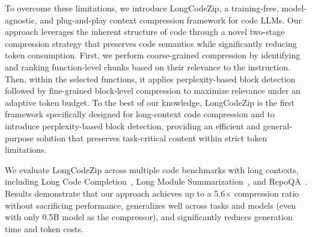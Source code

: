 \documentclass[10pt,conference]{IEEEtran}
\newcommand{\todoc}[2]{{\textcolor{#1}{\textbf{[#2]}}}}
\newcommand{\todoblue}[1]{\todoc{blue}{\textbf{#1}}}
\newcommand{\gu}[1]{\todoblue{Gu: #1}}
\newcommand{\shi}[1]{\todoc{orange}{Shi: #1}}
\newcommand{\approach}{{LongCodeZip}\xspace} %
\begin{document}
To overcome these limitations, we introduce \approach, a training-free, model-agnostic, and plug-and-play context compression framework for code LLMs. Our approach leverages the inherent structure of code through a novel two-stage compression strategy that preserves code semantics while significantly reducing token consumption. First, we perform coarse-grained compression by identifying and ranking function-level chunks based on their relevance to the instruction. Then, within the selected functions, it applies perplexity-based block detection followed by fine-grained block-level compression %
to maximize relevance under an adaptive token budget. To the best of our knowledge, \approach is the first framework specifically designed for long-context code compression and to introduce perplexity-based block detection, providing an efficient and general-purpose solution that preserves task-critical content within strict token limitations. 

We evaluate \approach across multiple code benchmarks with long contexts, including Long Code Completion~\cite{guo2023longcoder}, Long Module Summarization~\cite{bogomolov2024long}, and RepoQA~\cite{liu2024repoqa}. 
Results demonstrate that our approach achieves up to a 5.6× compression ratio without sacrificing performance, generalizes well across tasks and models (even with only 0.5B model as the compressor), and significantly reduces generation time and token costs.
\end{document}
